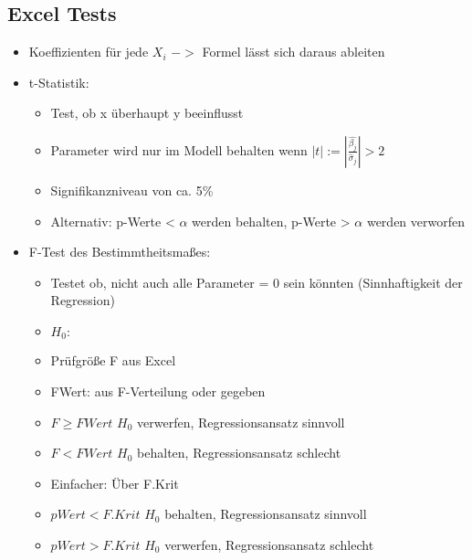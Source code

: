 \documentclass[a4paper]{article}
\begin{document}
\begin{landscape}
\begin{multicols}{4}
    \section*{Excel Tests}
    \begin{itemize}[noitemsep,nolistsep,leftmargin=*]
        \item Koeffizienten für jede $X_i$ $->$ Formel lässt sich daraus ableiten
        \item t-Statistik:
        \begin{itemize}[noitemsep,nolistsep,leftmargin=*]
            \item Test, ob x überhaupt y beeinflusst
            \item Parameter wird nur im Modell behalten wenn $|t| := |\frac{\hat{\beta_j}}{\hat{\sigma}_j}| > 2$
            \item Signifikanzniveau von ca. 5\%
            \item Alternativ: p-Werte < $\alpha$ werden behalten, p-Werte > $\alpha$ werden verworfen
        \end{itemize}
        \item F-Test des Bestimmtheitsmaßes:
        \begin{itemize}[noitemsep,nolistsep,leftmargin=*]
            \item Testet ob, nicht auch alle Parameter = 0 sein könnten (Sinnhaftigkeit der Regression)
            \item $H_0: $
            \item Prüfgröße F aus Excel
            \item FWert: aus F-Verteilung oder gegeben
            \item $F  \geq FWert$ $H_0$ verwerfen, Regressionsansatz sinnvoll
            \item $F < FWert$ $H_0$ behalten, Regressionsansatz schlecht
            \item Einfacher: Über  F.Krit
            \item $p Wert < F.Krit$ $H_0$ behalten, Regressionsansatz sinnvoll
            \item $p Wert > F.Krit$ $H_0$ verwerfen, Regressionsansatz schlecht
        \end{itemize}
    \end{itemize}


\end{multicols}
\end{landscape}
\end{document}
